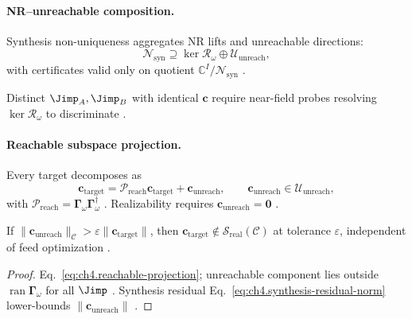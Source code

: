 \paragraph{NR--unreachable composition.}
Synthesis non-uniqueness aggregates NR lifts and unreachable directions:
\begin{equation}
\label{eq:ch4.nr-unreachable-composition}
\mathcal{N}_{\mathrm{syn}}\supseteq\ker\mathcal{R}_\omega\oplus\mathcal{U}_{\mathrm{unreach}},
\end{equation}
with certificates valid only on quotient \(\mathbb{C}^{I}/\mathcal{N}_{\mathrm{syn}}\) \cite{stratton1941,harrington2001,devaney2004}.
\begin{lemma}
\label{lem:ch4.nf-discrimination}
Distinct \(\Jimp_{A},\Jimp_{B}\) with identical \(\mathbf{c}\) require near-field probes resolving \(\ker\mathcal{R}_\omega\) to discriminate
\cite{harrington2001,stratton1941}.
\end{lemma}

\paragraph{Reachable subspace projection.}
Every target decomposes as
\begin{equation}
\label{eq:ch4.reachable-projection}
\mathbf{c}_{\mathrm{target}}=\mathcal{P}_{\mathrm{reach}}\mathbf{c}_{\mathrm{target}}+\mathbf{c}_{\mathrm{unreach}},\qquad
\mathbf{c}_{\mathrm{unreach}}\in\mathcal{U}_{\mathrm{unreach}},
\end{equation}
with \(\mathcal{P}_{\mathrm{reach}}=\boldsymbol{\Gamma}_\omega\boldsymbol{\Gamma}_\omega^{\dagger}\) \cite{harrington2001,stratton1941,devaney2004}.
Realizability requires \(\mathbf{c}_{\mathrm{unreach}}=\mathbf{0}\) \cite{hansen1988}.

\begin{theorem}
\label{thm:ch4.unreachable-obstruction}
If \(\|\mathbf{c}_{\mathrm{unreach}}\|_{\mathcal{C}}>\varepsilon\|\mathbf{c}_{\mathrm{target}}\|\), then
\(\mathbf{c}_{\mathrm{target}}\notin\mathcal{S}_{\mathrm{real}}(\mathcal{C})\) at tolerance \(\varepsilon\), independent of feed optimization
\cite{stratton1941,harrington2001,devaney2004,hansen1988}.
\end{theorem}
\begin{proof}
Eq.~\eqref{eq:ch4.reachable-projection}; unreachable component lies outside \(\operatorname{ran}\boldsymbol{\Gamma}_\omega\) for all \(\Jimp\)
\cite{stratton1941,harrington2001}. Synthesis residual Eq.~\eqref{eq:ch4.synthesis-residual-norm} lower-bounds \(\|\mathbf{c}_{\mathrm{unreach}}\|\)
\cite{devaney2004,hansen1988}.
\end{proof}

